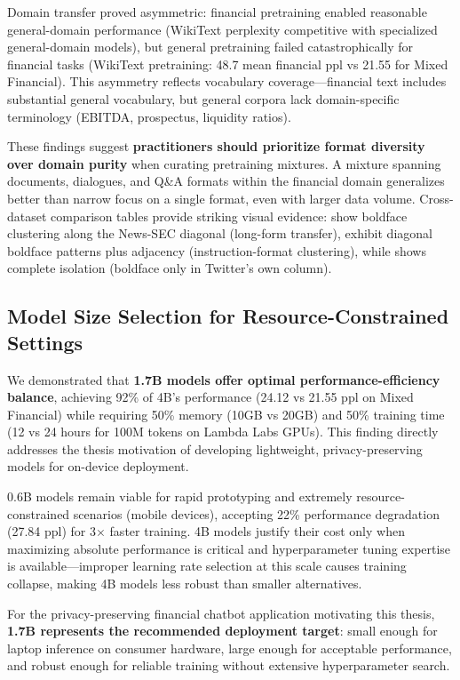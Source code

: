Domain transfer proved asymmetric: financial pretraining enabled reasonable general-domain performance (WikiText perplexity competitive with specialized general-domain models), but general pretraining failed catastrophically for financial tasks (WikiText pretraining: 48.7 mean financial ppl vs 21.55 for Mixed Financial). This asymmetry reflects vocabulary coverage—financial text includes substantial general vocabulary, but general corpora lack domain-specific terminology (EBITDA, prospectus, liquidity ratios).

These findings suggest \textbf{practitioners should prioritize format diversity over domain purity} when curating pretraining mixtures. A mixture spanning documents, dialogues, and Q\&A formats within the financial domain generalizes better than narrow focus on a single format, even with larger data volume. Cross-dataset comparison tables provide striking visual evidence:  show boldface clustering along the News-SEC diagonal (long-form transfer),  exhibit diagonal boldface patterns plus adjacency (instruction-format clustering), while  shows complete isolation (boldface only in Twitter's own column).

\subsection{Model Size Selection for Resource-Constrained Settings}

We demonstrated that \textbf{1.7B models offer optimal performance-efficiency balance}, achieving 92\% of 4B's performance (24.12 vs 21.55 ppl on Mixed Financial) while requiring 50\% memory (10GB vs 20GB) and 50\% training time (12 vs 24 hours for 100M tokens on Lambda Labs GPUs). This finding directly addresses the thesis motivation of developing lightweight, privacy-preserving models for on-device deployment.

0.6B models remain viable for rapid prototyping and extremely resource-constrained scenarios (mobile devices), accepting 22\% performance degradation (27.84 ppl) for 3$\times$ faster training. 4B models justify their cost only when maximizing absolute performance is critical and hyperparameter tuning expertise is available—improper learning rate selection at this scale causes training collapse, making 4B models less robust than smaller alternatives.

For the privacy-preserving financial chatbot application motivating this thesis, \textbf{1.7B represents the recommended deployment target}: small enough for laptop inference on consumer hardware, large enough for acceptable performance, and robust enough for reliable training without extensive hyperparameter search.

